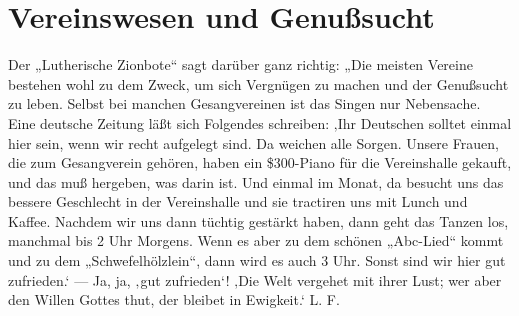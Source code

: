 \chapter[Vereinswesen und Genußsucht]{Vereinswesen und Genußsucht}
Der „Lutherische Zionbote“ sagt darüber ganz richtig: „Die meisten Vereine bestehen wohl zu dem Zweck, um sich Vergnügen zu machen und der Genußsucht zu leben. Selbst bei manchen Gesangvereinen ist das Singen nur Nebensache. Eine deutsche Zeitung läßt sich Folgendes schreiben: ‚Ihr Deutschen solltet einmal hier sein, wenn wir recht aufgelegt sind. Da weichen alle Sorgen. Unsere Frauen, die zum Gesangverein gehören, haben ein \$300-Piano für die Vereinshalle gekauft, und das muß hergeben, was darin ist. Und einmal im Monat, da besucht uns das bessere Geschlecht in der Vereinshalle und sie tractiren uns mit Lunch und Kaffee. Nachdem wir uns dann tüchtig gestärkt haben, dann geht das Tanzen los, manchmal bis 2 Uhr Morgens. Wenn es aber zu dem schönen „Abc-Lied“ kommt und zu dem „Schwefelhölzlein“, dann wird es auch 3 Uhr. Sonst sind wir hier gut zufrieden.‘ — Ja, ja, ‚gut zufrieden‘! ‚Die Welt vergehet mit ihrer Lust; wer aber den Willen Gottes thut, der bleibet in Ewigkeit.‘ L. F.
